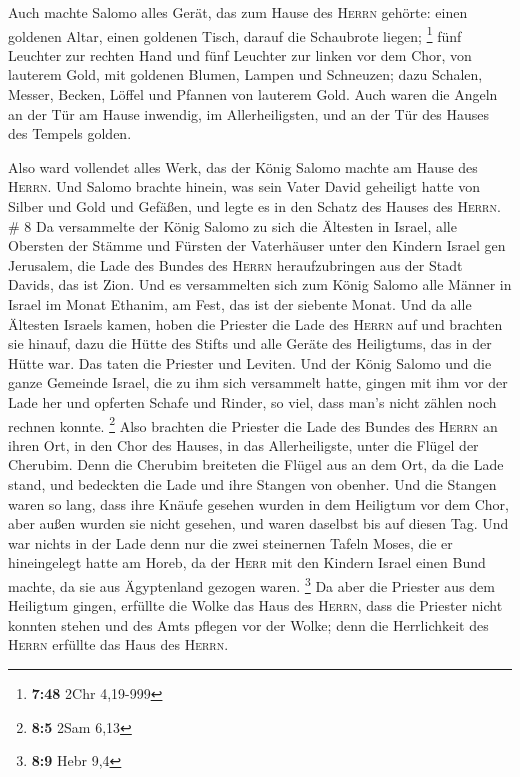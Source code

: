  Auch machte Salomo alles Gerät, das zum Hause des
\textsc{Herrn} gehörte: einen goldenen Altar, einen goldenen Tisch,
darauf die Schaubrote liegen; \footnote{\textbf{7:48} 2Chr 4,19-999}
 fünf Leuchter zur rechten Hand und fünf Leuchter zur
linken vor dem Chor, von lauterem Gold, mit goldenen Blumen, Lampen und
Schneuzen;  dazu Schalen, Messer, Becken, Löffel und
Pfannen von lauterem Gold. Auch waren die Angeln an der Tür am Hause
inwendig, im Allerheiligsten, und an der Tür des Hauses des Tempels
golden.

 Also ward vollendet alles Werk, das der König Salomo
machte am Hause des \textsc{Herrn}. Und Salomo brachte hinein, was sein
Vater David geheiligt hatte von Silber und Gold und Gefäßen, und legte
es in den Schatz des Hauses des \textsc{Herrn}. \# 8  Da
versammelte der König Salomo zu sich die Ältesten in Israel, alle
Obersten der Stämme und Fürsten der Vaterhäuser unter den Kindern Israel
gen Jerusalem, die Lade des Bundes des \textsc{Herrn} heraufzubringen
aus der Stadt Davids, das ist Zion.  Und es versammelten
sich zum König Salomo alle Männer in Israel im Monat Ethanim, am Fest,
das ist der siebente Monat.  Und da alle Ältesten Israels
kamen, hoben die Priester die Lade des \textsc{Herrn} auf 
und brachten sie hinauf, dazu die Hütte des Stifts und alle Geräte des
Heiligtums, das in der Hütte war. Das taten die Priester und Leviten.
 Und der König Salomo und die ganze Gemeinde Israel, die
zu ihm sich versammelt hatte, gingen mit ihm vor der Lade her und
opferten Schafe und Rinder, so viel, dass man's nicht zählen noch
rechnen konnte. \footnote{\textbf{8:5} 2Sam 6,13}  Also
brachten die Priester die Lade des Bundes des \textsc{Herrn} an ihren
Ort, in den Chor des Hauses, in das Allerheiligste, unter die Flügel der
Cherubim.  Denn die Cherubim breiteten die Flügel aus an
dem Ort, da die Lade stand, und bedeckten die Lade und ihre Stangen von
obenher.  Und die Stangen waren so lang, dass ihre Knäufe
gesehen wurden in dem Heiligtum vor dem Chor, aber außen wurden sie
nicht gesehen, und waren daselbst bis auf diesen Tag.  Und
war nichts in der Lade denn nur die zwei steinernen Tafeln Moses, die er
hineingelegt hatte am Horeb, da der \textsc{Herr} mit den Kindern Israel
einen Bund machte, da sie aus Ägyptenland gezogen waren. \footnote{\textbf{8:9}
  Hebr 9,4}  Da aber die Priester aus dem Heiligtum
gingen, erfüllte die Wolke das Haus des \textsc{Herrn}, 
dass die Priester nicht konnten stehen und des Amts pflegen vor der
Wolke; denn die Herrlichkeit des \textsc{Herrn} erfüllte das Haus des
\textsc{Herrn}.


